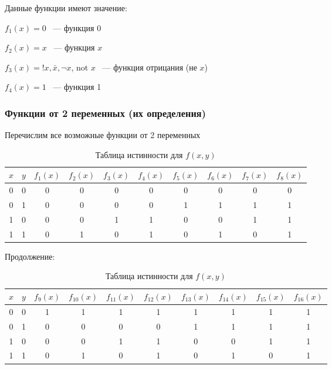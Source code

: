 \documentclass[russian]{lecture-notes}
\begin{document}
\begin{sloppypar}
\begin{example}
	Данные функции имеют значение:
	
	$f_1(x) = 0$ ~--- функция 0
	
	$f_2(x) = x$ ~--- функция $x$
	
	$f_3(x) = !x, \bar x, \neg x$, not $x$ ~--- функция отрицания (не $x$)
	
	$f_4(x) = 1$ ~--- функция 1
	
\end{example}

\subsubsection{Функции от 2 переменных (их определения)}

\begin{example}
	Перечислим все возможные функции от 2 переменных
	
	\begin{table}[h!]
	\centering
		\begin{tabular}{|c|c|c|c|c|c|c|c|c|c|}
			\hline
			$x$ & $y$ & $f_1(x)$ & $f_2(x)$ & $f_3(x)$ & $f_4(x)$ & $f_5(x)$ & $f_6(x)$ & $f_7(x)$ & $f_8(x)$ \\ \hline
			0 & 0 & 0       & 0       & 0       & 0       & 0       & 0       & 0       & 0       \\ \hline
			0 & 1 & 0       & 0       & 0       & 0       & 1       & 1       & 1       & 1       \\ \hline
			1 & 0 & 0       & 0       & 1       & 1       & 0       & 0       & 1       & 1       \\ \hline
			1 & 1 & 0       & 1       & 0       & 1       & 0       & 1       & 0       & 1       \\ \hline
		\end{tabular}
		\caption{Таблица истинности для $f(x,y)$}
	\end{table}
	
	Продолжение:
	
	\begin{table}[h!]
	\centering
		\begin{tabular}{|c|c|c|c|c|c|c|c|c|c|}
			\hline
			$x$ & $y$ & $f_9(x)$ & $f_{10}(x)$ & $f_{11}(x)$ & $f_{12}(x)$ & $f_{13}(x)$ & $f_{14}(x)$ & $f_{15}(x)$ & $f_{16}(x)$ \\ \hline
			0 & 0 & 1       & 1       & 1       & 1       & 1       & 1       & 1       & 1       \\ \hline
			0 & 1 & 0       & 0       & 0       & 0       & 1       & 1       & 1       & 1       \\ \hline
			1 & 0 & 0       & 0       & 1       & 1       & 0       & 0       & 1       & 1       \\ \hline
			1 & 1 & 0       & 1       & 0       & 1       & 0       & 1       & 0       & 1       \\ \hline
		\end{tabular}
		\caption{Таблица истинности для $f(x,y)$}
	\end{table}
	

\end{example}
\end{sloppypar}
\end{document}
